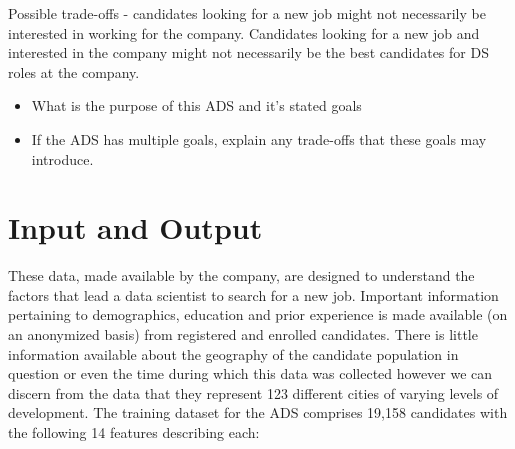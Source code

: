 \documentclass[11pt]{article}
\begin{document}
Possible trade-offs - candidates looking for a new job might not necessarily be interested in working for the company.  Candidates looking for a new job and interested in the company might not necessarily be the best candidates for DS roles at the company.

\begin{itemize}
\item What is the purpose of this ADS and it's stated goals
\item If the ADS has multiple goals, explain any trade-offs that these goals may introduce.
\end{itemize}


\pagebreak

\section{Input and Output}

These data, made available by the company, are designed to understand the factors that lead a data scientist to search for a new job.  Important information pertaining to demographics, education and prior experience is made available (on an anonymized basis) from registered and enrolled candidates.  There is little information available about the geography of the candidate population in question or even the time during which this data was collected however we can discern from the data that they represent 123 different cities of varying levels of development.  The training dataset for the ADS comprises 19,158 candidates with the following 14 features describing each:
\end{document}
